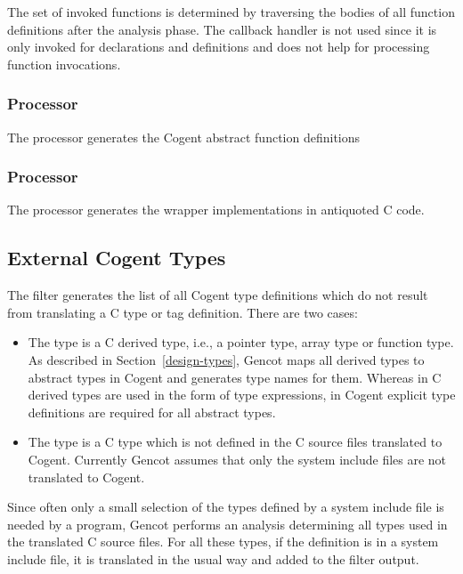 The set of invoked functions is determined by traversing the bodies of all function definitions after the analysis
phase. The callback handler is not used since it is only invoked for declarations and definitions and does not help
for processing function invocations.

\subsubsection{Processor }

The processor  generates the Cogent abstract function definitions

\subsubsection{Processor }

The processor  generates the wrapper implementations in antiquoted C code.

\subsection{External Cogent Types}
\label{impl-comps-exttypes}

The filter  generates the list of all Cogent type definitions which do not result from
translating a C type or tag definition. There are two cases:
\begin{itemize}
\item The type is a C derived type, i.e., a pointer type, array type or function type. As described in 
Section~\ref{design-types}, Gencot maps all derived types to abstract types in Cogent and generates type names for
them. Whereas in C derived types are used in the form of type expressions, in Cogent explicit type definitions are
required for all abstract types.
\item The type is a C type which is not defined in the C source files translated to Cogent. Currently Gencot assumes
that only the system include files are not translated to Cogent. 
\end{itemize}

Since often only a small selection of the types defined by a system include file is needed by a program, Gencot performs 
an analysis determining all types used in the translated C source files. For all these types, if the definition is in a 
system include file, it is translated in the usual way and added to the filter output.

